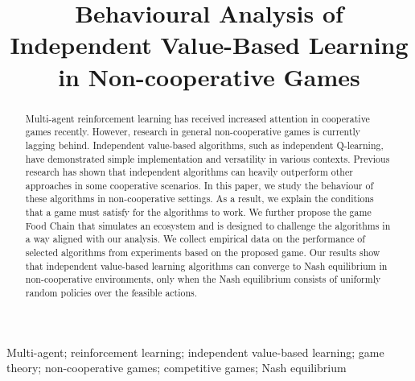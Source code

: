 \documentclass[]{interact}
\theoremstyle{plain}%
\theoremstyle{definition}
\theoremstyle{remark}
\begin{document}

\title{Behavioural Analysis of Independent Value-Based Learning in Non-cooperative Games}

\author{
}

\maketitle

\begin{abstract}
Multi-agent reinforcement learning has received increased attention in cooperative games recently. However, research in general non-cooperative games is currently lagging behind. Independent value-based algorithms, such as independent Q-learning, have demonstrated simple implementation and versatility in various contexts. Previous research has shown that independent algorithms can heavily outperform other approaches in some cooperative scenarios. In this paper, we study the behaviour of these algorithms in non-cooperative settings. As a result, we explain the conditions that a game must satisfy for the algorithms to work. We further propose the game Food Chain that simulates an ecosystem and is designed to challenge the algorithms in a way aligned with our analysis. We collect empirical data on the performance of selected algorithms from experiments based on the proposed game. Our results show that independent value-based learning algorithms
can converge to Nash equilibrium in non-cooperative environments, only when the Nash equilibrium consists of uniformly random policies over the feasible actions.
\end{abstract}

\begin{keywords}
Multi-agent; reinforcement learning; independent value-based learning; game theory; non-cooperative games; competitive games; Nash equilibrium
\end{keywords}
\end{document}
